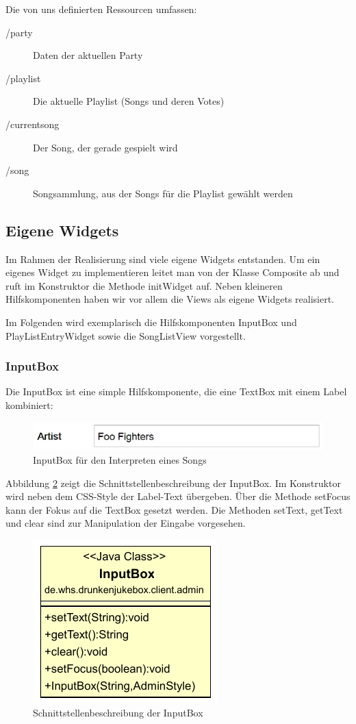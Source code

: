 Die von uns definierten Ressourcen umfassen:
\begin{description}
	\item[/party] Daten der aktuellen Party
	\item[/playlist] Die aktuelle Playlist (Songs und deren Votes)
	\item[/currentsong] Der Song, der gerade gespielt wird
	\item[/song] Songsammlung, aus der Songs für die Playlist gewählt werden
\end{description}

\subsection{Eigene Widgets}
Im Rahmen der Realisierung sind viele eigene Widgets entstanden. Um ein eigenes Widget zu implementieren leitet man von der Klasse Composite ab und ruft im Konstruktor die Methode initWidget auf. Neben kleineren Hilfskomponenten haben wir vor allem die Views als eigene Widgets realisiert.

Im Folgenden wird exemplarisch die Hilfskomponenten InputBox und PlayListEntryWidget sowie die SongListView vorgestellt.

\subsubsection{InputBox}
Die InputBox ist eine simple Hilfskomponente, die eine TextBox mit einem Label kombiniert:

\begin{figure}[H]
\centering
\includegraphics[width=0.7\linewidth]{Bilder/InputBox}
\caption{InputBox für den Interpreten eines Songs}
\label{fig:InputBox}
\end{figure}

Abbildung \ref{fig:InputBoxClass} zeigt die Schnittstellenbeschreibung der InputBox. Im Konstruktor wird neben dem CSS-Style der Label-Text übergeben. Über die Methode setFocus kann der Fokus auf die TextBox gesetzt werden. Die Methoden setText, getText und clear sind zur Manipulation der Eingabe vorgesehen.

\begin{figure}[H]
\centering
\includegraphics[width=0.3\linewidth]{Bilder/InputBoxClass}
\caption{Schnittstellenbeschreibung der InputBox}
\label{fig:InputBoxClass}
\end{figure}


